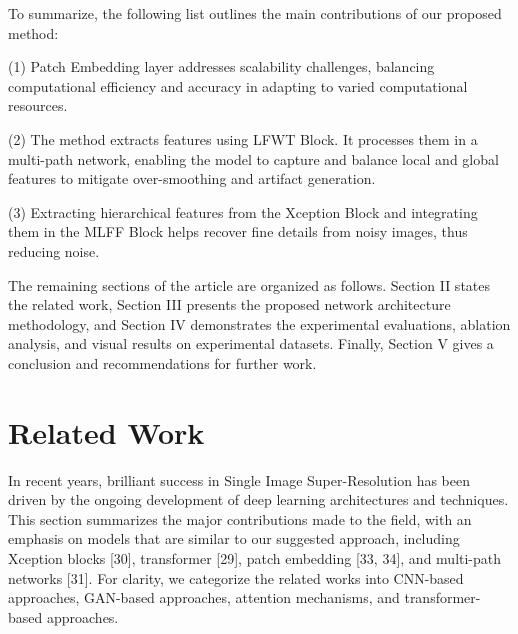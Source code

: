 \documentclass[twocolumn]{svjour3}          %
\begin{document}
To summarize, the following list outlines the main contributions of our proposed method:

(1) Patch Embedding layer addresses scalability challenges, balancing computational efficiency and accuracy in adapting to varied computational resources. 

(2) The method extracts features using LFWT Block. It processes them in a multi-path network, enabling the model to capture and balance local and global features to mitigate over-smoothing and artifact generation. 

(3) Extracting hierarchical features from the Xception Block and integrating them in the MLFF Block helps recover fine details from noisy images, thus reducing noise.  

The remaining sections of the article are organized as follows. Section II states the related work, Section III presents the proposed network architecture methodology, and Section IV demonstrates the experimental evaluations, ablation analysis, and visual results on experimental datasets. Finally, Section V gives a conclusion and recommendations for further work.

\section{Related Work}

In recent years, brilliant success in Single Image Super-Resolution has been driven by the ongoing development of deep learning architectures and techniques. This section summarizes the major contributions made to the field, with an emphasis on models that are similar to our suggested approach, including Xception blocks [30], transformer [29], patch embedding [33, 34], and multi-path networks [31]. For clarity, we categorize the related works into CNN-based approaches, GAN-based approaches, attention mechanisms, and transformer-based approaches. 
\end{document}
